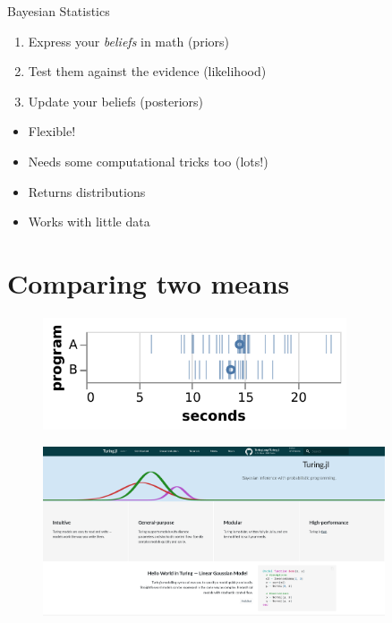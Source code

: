 \documentclass[aspectratio=169,xcolor=svgnames]{beamer}
\begin{document}
\begin{frame}
  \begin{block}{Bayesian Statistics}
    \begin{enumerate}
    \item Express your \emph{beliefs} in math (priors)
    \item Test them against the evidence (likelihood)
    \item Update your beliefs (posteriors)
    \end{enumerate}
  \end{block}

\end{frame}

\begin{frame}
  \begin{itemize}
  \item Flexible!
  \item Needs some computational tricks too (lots!)
  \item Returns distributions
  \item Works with little data
  \end{itemize}
\end{frame}

\section{Comparing two means}

\begin{frame}
  \begin{figure}[ht]
    \centering
    \includegraphics[width=0.8\textwidth]{figures/samples_a_b.pdf}
  \end{figure}
\end{frame}

\begin{frame}
\begin{figure}[ht]
  \centering
  \includegraphics[width=0.9\textwidth]{figures/turingjl.png}
\end{figure}
\end{frame}
\end{document}
